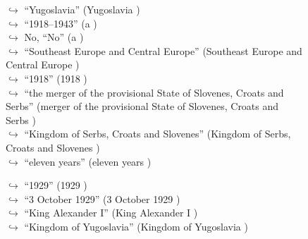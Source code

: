 \documentclass[11pt,a4paper, onecolumn]{article}
\begin{document}
\begin{figure}[t] \small \begin{tcolorbox}[boxsep=0pt,left=5pt,right=0pt,top=2pt,colback = yellow!5] \begin{dialogue}
 \small 
\colorbox{pink!25}{$\hookrightarrow$}
{ ``Yugoslavia'' (Yugoslavia ) }
\\
\colorbox{pink!25}{$\hookrightarrow$}
{ ``1918–1943'' (a ) }
\\
\colorbox{pink!25}{$\hookrightarrow$}
\colorbox{red!25}{No,}
{ ``No'' (a ) }
\\
\colorbox{pink!25}{$\hookrightarrow$}
{ ``Southeast Europe and Central Europe'' (Southeast Europe and Central Europe ) }
\\
\colorbox{pink!25}{$\hookrightarrow$}
{ ``1918'' (1918 ) }
\\
\colorbox{pink!25}{$\hookrightarrow$}
{ ``the merger of the provisional State of Slovenes, Croats and Serbs'' (merger of the provisional State of Slovenes, Croats and Serbs ) }
\\
\colorbox{pink!25}{$\hookrightarrow$}
{ ``Kingdom of Serbs, Croats and Slovenes'' (Kingdom of Serbs, Croats and Slovenes ) }
\\
\colorbox{pink!25}{$\hookrightarrow$}
{ ``eleven years'' (eleven years ) }
 \end{dialogue}\end{tcolorbox}\end{figure}\begin{figure}[t] \small \begin{tcolorbox}[boxsep=0pt,left=5pt,right=0pt,top=2pt,colback = yellow!5] \begin{dialogue}
 \small 
\colorbox{pink!25}{$\hookrightarrow$}
{ ``1929'' (1929 ) }
\\
\colorbox{pink!25}{$\hookrightarrow$}
{ ``3 October 1929'' (3 October 1929 ) }
\\
\colorbox{pink!25}{$\hookrightarrow$}
{ ``King Alexander I'' (King Alexander I ) }
\\
\colorbox{pink!25}{$\hookrightarrow$}
{ ``Kingdom of Yugoslavia'' (Kingdom of Yugoslavia ) }
\\
 \end{dialogue}\end{tcolorbox}\end{figure}
\end{document}
